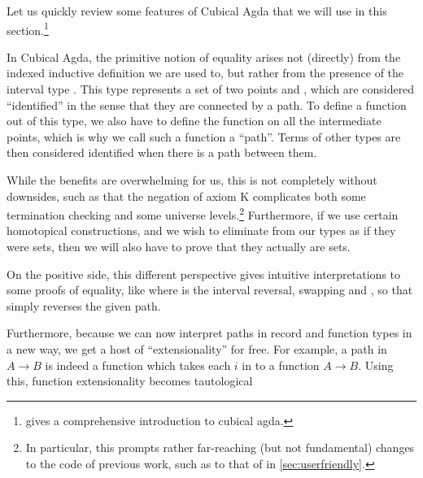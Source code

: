 Let us quickly review some features of Cubical Agda that we will use in this section.\footnote{\cite{cuagda} gives a comprehensive introduction to cubical agda.}

In Cubical Agda, the primitive notion of equality arises not (directly) from the indexed inductive definition we are used to, but rather from the presence of the interval type . This type represents a set of two points  and , which are considered ``identified'' in the sense that they are connected by a path. To define a function out of this type, we also have to define the function on all the intermediate points, which is why we call such a function a ``path''. Terms of other types are then considered identified when there is a path between them.

While the benefits are overwhelming for us, this is not completely without downsides, such as that
the negation of axiom K complicates both some termination checking and some universe levels.\footnote{In particular, this prompts rather far-reaching (but not fundamental) changes to the code of previous work, such as to that of \cite{progorn} in \autoref{sec:userfriendly}.} Furthermore, if we use certain homotopical constructions, and we wish to eliminate from our types as if they were sets, then we will also have to prove that they actually are sets.

On the positive side, this different perspective gives intuitive interpretations to some proofs of equality, like
where  is the interval reversal, swapping  and , so that  simply reverses the given path.

Furthermore, because we can now interpret paths in record and function types in a new way, we get a host of ``extensionality'' for free. For example, a path in $A \to B$ is indeed a function which takes each $i$ in  to a function $A \to B$. Using this, function extensionality becomes tautological 

